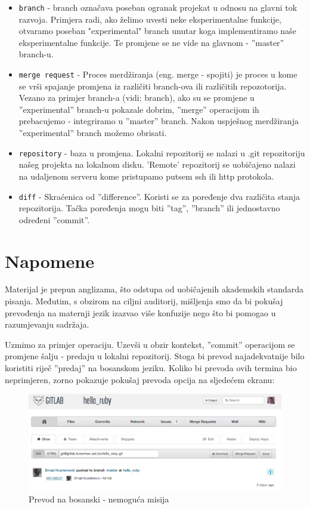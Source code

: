 \documentclass[times, utf8, seminar]{fit}
\begin{document}
\begin{itemize}
\begin{itemize}
    \item \texttt{branch} - branch označava poseban ogranak projekat u odnosu na glavni tok razvoja. Primjera radi, ako želimo uvesti neke eksperimentalne funkcije, otvaramo poseban "experimental" branch unutar koga implementiramo naše eksperimentalne funkcije. Te promjene se ne vide na glavnom - ''master'' branch-u.
    \item \texttt{merge request} - Proces merdžiranja (eng. merge - spojiti) je proces u kome se vrši spajanje promjena iz različiti branch-ova ili različitih repozotorija. Vezano za primjer branch-a (vidi: branch), ako su se promjene u ''experimental'' branch-u pokazale dobrim, ''merge'' operacijom ih prebacujemo - integriramo u ''master'' branch. Nakon uspješnog merdžiranja ''experimental'' branch možemo obrisati.
    \item \texttt{repository} - baza u promjena. Lokalni repozitorij se nalazi u .git repozitoriju našeg projekta na lokalnom disku. 'Remote' repozitorij se uobičajeno nalazi na udaljenom serveru kome pristupamo putsem ssh ili http protokola.
    \item \texttt{diff} - Skraćenica od ''difference''. Koristi se za poređenje dva različita stanja repozitorija. Tačka poređenja mogu biti ''tag'', ''branch'' ili jednostavno određeni ''commit''.
\end{itemize}

\chapter{Napomene}

Materijal je prepun anglizama, što odstupa od uobičajenih akademskih standarda pisanja. Međutim, s obzirom na ciljni auditorij, mišljenja smo da bi pokušaj prevođenja na maternji jezik izazvao više konfuzije nego što bi pomogao u razumjevanju sadržaja.

Uzmimo za primjer \href{http://translate.google.com/#en/hr/commit}{\color{blue}{''commit''}} operaciju.
Uzevši u obzir kontekst, ''commit'' operacijom se promjene šalju - predaju u lokalni repozitorij.
Stoga bi prevod najadekvatnije bilo koristiti riječ ''predaj'' na bosanskom jeziku.
Koliko bi prevoda ovih termina bio neprimjeren, zorno pokazuje pokušaj prevoda opcija na sljedećem ekranu:

\begin{figure}[H]
\centering
\includegraphics[width=16cm]{img/cik_prevedi.png}
\caption{Prevod na bosanski - nemoguća misija}
\end{figure}


\end{itemize}
\end{document}
